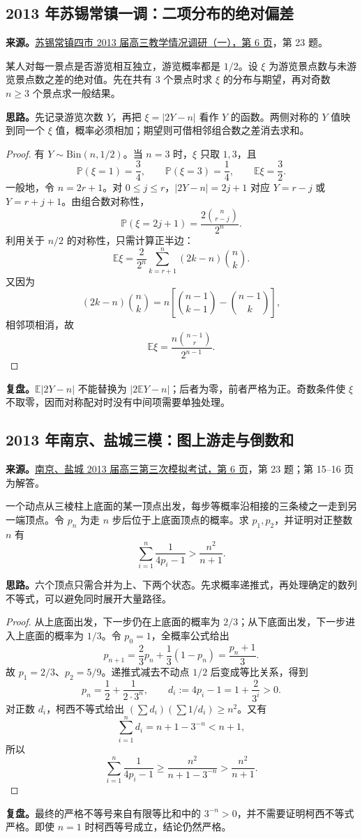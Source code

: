 \documentclass[UTF8,12pt,a4paper,fontset=fandol]{ctexart}
\begin{document}
\subsection{2013 年苏锡常镇一调：二项分布的绝对偏差}\label{sec:c2013sxcz1}
\textbf{来源。}\href{https://doc.xuehai.net/b0d470082d90b0ed78020c4e5-6.html}{苏锡常镇四市 2013 届高三教学情况调研（一），第 6 页}，第 23 题。
\begin{example}[题意]
某人对每一景点是否游览相互独立，游览概率都是 $1/2$。设 $\xi$ 为游览景点数与未游览景点数之差的绝对值。先在共有 $3$ 个景点时求 $\xi$ 的分布与期望，再对奇数 $n\geq3$ 个景点求一般结果。
\end{example}
\textbf{思路。}先记录游览次数 $Y$，再把 $\xi=|2Y-n|$ 看作 $Y$ 的函数。两侧对称的 $Y$ 值映到同一个 $\xi$ 值，概率必须相加；期望则可借相邻组合数之差消去求和。
\begin{proof}
有 $Y\sim\mathrm{Bin}(n,1/2)$。当 $n=3$ 时，$\xi$ 只取 $1,3$，且
\[
\mathbb P(\xi=1)=\frac34,\qquad
\mathbb P(\xi=3)=\frac14,\qquad \mathbb E\xi=\frac32.
\]
一般地，令 $n=2r+1$。对 $0\leq j\leq r$，$|2Y-n|=2j+1$ 对应 $Y=r-j$ 或 $Y=r+j+1$。由组合数对称性，
\[
\mathbb P(\xi=2j+1)=\frac{2\binom n{r-j}}{2^n}.
\]
利用关于 $n/2$ 的对称性，只需计算正半边：
\[
\mathbb E\xi=\frac2{2^n}\sum_{k=r+1}^{n}(2k-n)\binom nk.
\]
又因为
\[
(2k-n)\binom nk
=n\left[\binom{n-1}{k-1}-\binom{n-1}k\right],
\]
相邻项相消，故
\[
\boxed{\mathbb E\xi=\frac{n\binom{n-1}r}{2^{n-1}}.}
\]
\end{proof}
\textbf{复盘。}$\mathbb E|2Y-n|$ 不能替换为 $|2\mathbb EY-n|$；后者为零，前者严格为正。奇数条件使 $\xi$ 不取零，因而对称配对时没有中间项需要单独处理。

\subsection{2013 年南京、盐城三模：图上游走与倒数和}\label{sec:c2013ny3}
\textbf{来源。}\href{https://doc.xuehai.net/b764d9602946662646540b4b9-6.html}{南京、盐城 2013 届高三第三次模拟考试，第 6 页}，第 23 题；第 15--16 页为解答。
\begin{example}[题意]
一个动点从三棱柱上底面的某一顶点出发，每步等概率沿相接的三条棱之一走到另一端顶点。令 $p_n$ 为走 $n$ 步后位于上底面顶点的概率。求 $p_1,p_2$，并证明对正整数 $n$ 有
\[
\sum_{i=1}^{n}\frac1{4p_i-1}>\frac{n^2}{n+1}.
\]
\end{example}
\textbf{思路。}六个顶点只需合并为上、下两个状态。先求概率递推式，再处理确定的数列不等式，可以避免同时展开大量路径。
\begin{proof}
从上底面出发，下一步仍在上底面的概率为 $2/3$；从下底面出发，下一步进入上底面的概率为 $1/3$。令 $p_0=1$，全概率公式给出
\[
p_{n+1}=\frac23p_n+\frac13(1-p_n)=\frac{p_n+1}{3}.
\]
故 $p_1=2/3$、$p_2=5/9$。递推式减去不动点 $1/2$ 后变成等比关系，得到
\[
p_n=\frac12+\frac1{2\cdot3^n},\qquad d_i:=4p_i-1=1+\frac2{3^i}>0.
\]
对正数 $d_i$，柯西不等式给出 $(\sum d_i)(\sum1/d_i)\geq n^2$。又有
\[
\sum_{i=1}^{n}d_i=n+1-3^{-n}<n+1,
\]
所以
\[
\sum_{i=1}^{n}\frac1{4p_i-1}
\geq\frac{n^2}{n+1-3^{-n}}>\frac{n^2}{n+1}.
\]
\end{proof}
\textbf{复盘。}最终的严格不等号来自有限等比和中的 $3^{-n}>0$，并不需要证明柯西不等式严格。即使 $n=1$ 时柯西等号成立，结论仍然严格。
\end{document}
